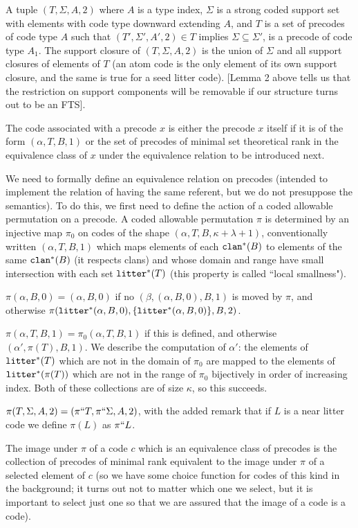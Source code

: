 \documentclass{article}
\begin{document}
\begin{description}
A tuple $(T,\Sigma,A,2)$ where $A$ is a type index, $\Sigma$ is a strong coded support set with elements with code type downward extending $A$,  and $T$ is a set of precodes of code type $A$  such that 
$(T',\Sigma',A',2) \in T$ implies $\Sigma \subseteq \Sigma'$, is a precode of code type $A_1$.  The support closure of  $(T,\Sigma,A,2)$ is the union of $\Sigma$ and all support closures of elements of $T$ (an atom code is the only element of its own support closure, and the same is true for a seed litter code).  [Lemma 2 above tells us that the restriction on support components will be removable if our structure turns out to be an FTS].

The code associated with a precode $x$ is either the precode $x$ itself if it is of the form $(\alpha,T,B,1)$ or the set of precodes of minimal set theoretical rank in the equivalence class
of $x$ under the equivalence relation to be introduced next.

We need to formally define an equivalence relation on precodes (intended to implement the relation of having the same referent, but we do not presuppose the semantics).  To do this, we first need to define the action of a coded allowable permutation on a precode.   A coded allowable permutation $\pi$ is determined by an injective map $\pi_0$ on codes of the shape $(\alpha,T,B,\kappa+\lambda+1)$, conventionally written $(\alpha,T,B,1)$ which maps
elements of each ${\tt clan}^*(B)$ to elements of the same ${\tt clan}^*(B)$ (it respects clans) and whose domain and range have small intersection with each set ${\tt litter}^*(T)$ (this property is called ``local smallness").

$\pi(\alpha,B,0) = (\alpha,B,0)$ if no $(\beta, (\alpha,B,0),B,1)$ is moved by $\pi$, and otherwise $\pi({\tt litter}^*(\alpha,B,0),\{{\tt litter}^*(\alpha,B,0)\},B,2)$.

$\pi(\alpha,T,B,1) = \pi_0(\alpha,T,B,1)$ if this is defined, and otherwise $(\alpha',\pi(T),B,1)$.  We describe the computation of $\alpha'$:  the elements
of ${\tt litter}^*(T)$ which are not in the domain of $\pi_0$ are mapped to the elements of ${\tt litter}^*(\pi(T))$ which are not in the range of $\pi_0$ bijectively in order of increasing index.  Both of these collections are of size $\kappa$, so this succeeds.

$\pi(T,\Sigma,A,2) = (\pi``T,\pi``\Sigma,A,2)$, with the added remark that if $L$ is a near litter code we define $\pi(L)$ as $\pi``L$.

The image under $\pi$ of a code $c$ which is an equivalence class of precodes is the collection of precodes of minimal rank equivalent to the image under $\pi$ of a selected element of $c$ (so we have some choice function for codes of this kind in the background;  it turns out not to  matter which one we select, but it is important to select just one so that we are assured that the image of a code is a code).


\end{description}
\end{document}
